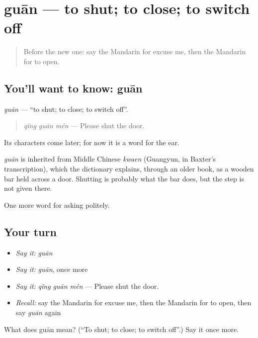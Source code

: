 \section[guān]{guān — to shut; to close; to switch off}

\label{lesson:ZH-C65-guan}



\begin{quote}
Before the new one: say the Mandarin for excuse me, then the Mandarin for to open.
\end{quote}

\subsection*{You'll want to know: guān}
\emph{guān} — \textquotedblleft{}to shut; to close; to switch off\textquotedblright{}.

\begin{quote}
\emph{qǐng guān mén} — Please shut the door.
\end{quote}

Its characters come later; for now it is a word for the ear.

\begin{cousinweb}
\emph{guān} is inherited from Middle Chinese \emph{kwaen} (Guangyun, in Baxter's transcription), which the dictionary explains, through an older book, as a wooden bar held across a door. Shutting is probably what the bar does, but the step is not given there.
\end{cousinweb}

\begin{grammarlens}[title={What you've built}]
One more word for asking politely.
\end{grammarlens}

\subsection*{Your turn}
\begin{itemize}
\raggedright
  \item \emph{Say it:} \emph{guān}
  \item \emph{Say it:} \emph{guān}, once more
  \item \emph{Say it:} \emph{qǐng guān mén} — Please shut the door.
  \item \emph{Recall:} say the Mandarin for excuse me, then the Mandarin for to open, then say \emph{guān} again
\end{itemize}

\begin{tcolorbox}[breakable,colback=teal!4,colframe=teal!35!black,title={Before you move on}]
What does guān mean? (\textquotedblleft{}To shut; to close; to switch off\textquotedblright{}.) Say it once more.
\end{tcolorbox}
